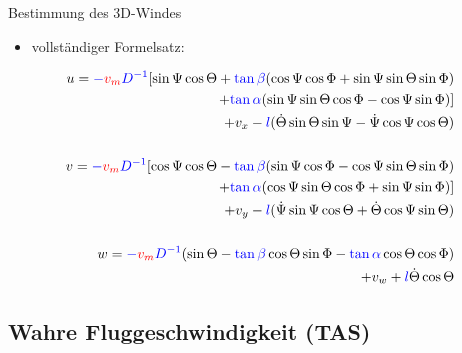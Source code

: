 \documentclass[ucs,9pt]{beamer}
\begin{document}
\begin{frame}{Bestimmung des 3D-Windes}
	\begin{itemize}
		\item vollständiger Formelsatz:
	\end{itemize}
	\begin{equation}
		\begin{split}
			u=\textcolor{blue}{-}\textcolor{red}{v_m}\textcolor{blue}{D^{-1}}[\sin\Psi\cos\Theta + \textcolor{blue}{\tan\beta}(\cos\Psi\cos\Phi + \sin\Psi\sin\Theta\sin\Phi) \\
			+ \textcolor{blue}{\tan\alpha}(\sin\Psi\sin\Theta\cos\Phi - \cos\Psi\sin\Phi)] \\
			+  v_{x} - \textcolor{blue}{l}(\dot{\Theta}\sin\Theta\sin\Psi - \dot{\Psi}\cos\Psi\cos\Theta)\\ 
			\\
			v=\textcolor{blue}{-}\textcolor{red}{v_m}\textcolor{blue}{D^{-1}}[\cos\Psi\cos\Theta - \textcolor{blue}{\tan\beta}(\sin\Psi\cos\Phi - \cos\Psi\sin\Theta\sin\Phi) \\
			+ \textcolor{blue}{\tan\alpha}(\cos\Psi\sin\Theta\cos\Phi + \sin\Psi\sin\Phi)] \\
			+ v_{y} - \textcolor{blue}{l}(\dot{\Psi}\sin\Psi\cos\Theta + \dot{\Theta}\cos\Psi\sin\Theta) \\ 
			\\
			w=\textcolor{blue}{-}\textcolor{red}{v_m}\textcolor{blue}{D^{-1}}(\sin\Theta - \textcolor{blue}{\tan\beta}\cos\Theta\sin\Phi - \textcolor{blue}{\tan\alpha}\cos\Theta\cos\Phi) \\
			+ v_{w} + \textcolor{blue}{l}\dot{\Theta}\cos\Theta
		\end{split}
	\end{equation}
\end{frame}

\subsection{Wahre Fluggeschwindigkeit (TAS)}
\end{document}
